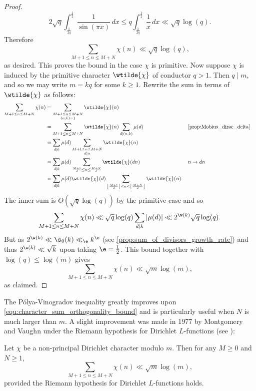 \begin{proof}
      \[
        2\sqrt{q}\int_{\frac{1}{2q}}^{\frac{1}{2}}\frac{1}{\sin(\pi x)}\,dx \le q\int_{\frac{1}{2q}}^{\frac{1}{2}}\frac{1}{x}\,dx \ll \sqrt{q}\log(q).
      \]
      Therefore
      \[
        \sum_{M+1 \le n \le M+N}\chi(n) \ll \sqrt{q}\log(q),
      \]
      as desired. This proves the bound in the case $\chi$ is primitive. Now suppose $\chi$ is induced by the primitive character $\wtilde{\chi}$ of conductor $q > 1$. Then $q \mid m$, and so we may write $m = kq$ for some $k \ge 1$. Rewrite the sum in terms of $\wtilde{\chi}$ as follows:
      \begin{align*}
        \sum_{M+1 \le n \le M+N}\chi(n) &= \sum_{\substack{M+1 \le n \le M+N \\ (n,k) = 1}}\wtilde{\chi}(n) \\
        &= \sum_{M+1 \le n \le M+N}\wtilde{\chi}(n)\sum_{d \mid (n,k)}\mu(d) && \text{\cref{prop:Mobius_dirac_delta}} \\
        &= \sum_{d \mid k}\mu(d)\sum_{\substack{M+1 \le n \le M+N \\ d \mid n}}\wtilde{\chi}(n) \\
        &= \sum_{d \mid k}\mu(d)\sum_{\frac{M+1}{d} \le n \le \frac{M+N}{d}}\wtilde{\chi}(dn) && \text{$n \to dn$} \\
        &= \sum_{d \mid k}\mu(d)\wtilde{\chi}(d)\sum_{\left\lfloor\frac{M+1}{d}\right\rfloor \le n \le \left\lfloor\frac{M+N}{d}\right\rfloor}\wtilde{\chi}(n).
      \end{align*}
      The inner sum is $O(\sqrt{q}\log(q))$ by the primitive case and so
      \[
        \sum_{M+1 \le n \le M+N}\chi(n) \ll \sqrt{q}\log(q)\sum_{d \mid k}|\mu(d)| \ll 2^{\w(k)}\sqrt{q}\log(q).
      \]
      But as $2^{\w(k)} \ll \s_{0}(k) \ll_{\e} k^{\e}$ (see \cref{prop:sum_of_divisors_growth_rate}) and thus $2^{\w(k)} \ll \sqrt{k}$ upon taking $\e = \frac{1}{2}$. This bound together with $\log(q) \le \log(m)$ gives
      \[
        \sum_{M+1 \le n \le M+N}\chi(n) \ll \sqrt{m}\log(m),
      \]
      as claimed.
    \end{proof}

    The P\'olya-Vinogradov inequality greatly improves upon \cref{equ:character_sum_orthogonality_bound} and is particularly useful when $N$ is much larger than $m$. A slight improvement was made in 1977 by Montgomery and Vaughn under the Riemann hypothesis for Dirichlet $L$-functions (see \cite{montgomery1977exponential}):

    \begin{theorem}\label{thm:MV_bound_character_sum}
      Let $\chi$ be a non-principal Dirichlet character modulo $m$. Then for any $M \ge 0$ and $N \ge 1$,
      \[
        \sum_{M+1 \le n \le M+N}\chi(n) \ll \sqrt{m}\log(m),
      \]
      provided the Riemann hypothesis for Dirichlet $L$-functions holds.
    \end{theorem}
    
